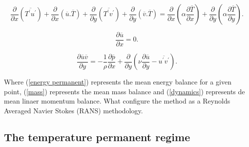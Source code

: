 \documentclass[10pt]{article} %
\begin{document}
\begin{equation}\label{energy permanent}
\frac{\partial{}}{\partial{x}} \left(\overline{T^\prime u^\prime}\right) + \frac{\partial{}}{\partial{x}}\left(\overline{u}.\overline{T}\right)     + 
\frac{\partial{}}{\partial{y}} \left(\overline{T^\prime v^\prime}\right) + \frac{\partial{}}{\partial{y}}\left(\overline{v}.\overline{T}\right) 
=
{\frac{\partial{}}{\partial{x}}} \left(\alpha {\frac{\partial{\overline{T}}}{\partial{x}}} \right) +
{\frac{\partial{}}{\partial{y}}} \left(\alpha {\frac{\partial{\overline{T}}}{\partial{y}}} \right). 
\end{equation}

\begin{equation}\label{mass}
\frac{\partial \overline{u}}{\partial x} = 0.
\end{equation}

\begin{equation}\label{dynamics}
\frac{\partial \overline{u}\overline{v}}{\partial y} = 
- \frac{1}{\rho} \frac{\partial \overline{p}}{\partial x} + \frac{\partial}{\partial y}\left(\nu \frac{\partial \overline{u}}{\partial y} - \overline{u^\prime v^\prime}\right).
\end{equation}

Where (\ref{energy permanent}) represents the mean energy balance for a given point, (\ref{mass}) represents the mean mass balance and (\ref{dynamics}) represents de mean linaer momentum balance. What configure the method as a Reynolds Averaged Navier Stokes (RANS) methodology.

\subsection{The temperature permanent regime}
\end{document}
